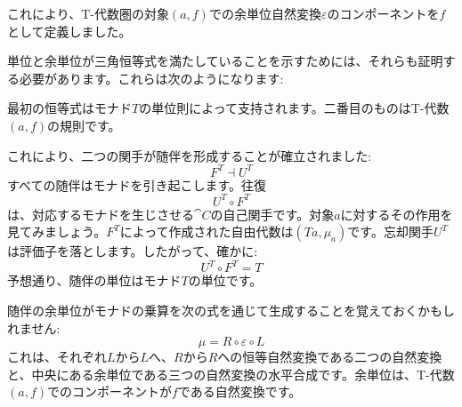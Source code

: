 \begin{figure}[H]
  \centering
\end{figure}

\noindent
これにより、T-代数圏の対象$(a, f)$での余単位自然変換$\varepsilon$のコンポーネントを$f$として定義しました。

単位と余単位が三角恒等式を満たしていることを示すためには、それらも証明する必要があります。これらは次のようになります: 

\begin{figure}[H]
  \centering
  \begin{subfigure}
    \centering
  \end{subfigure}%
  \hspace{1cm}
  \begin{subfigure}
    \centering
  \end{subfigure}
\end{figure}

\noindent
最初の恒等式はモナド$T$の単位則によって支持されます。二番目のものはT-代数$(a, f)$の規則です。

これにより、二つの関手が随伴を形成することが確立されました: 
\[F^T \dashv U^T\]
すべての随伴はモナドを引き起こします。往復
\[U^T \circ F^T\]
は、対応するモナドを生じさせる$\cat{C}$の自己関手です。対象$a$に対するその作用を見てみましょう。$F^T$によって作成された自由代数は$(T a, \mu_a)$です。忘却関手$U^T$は評価子を落とします。したがって、確かに: 
\[U^T \circ F^T = T\]
予想通り、随伴の単位はモナド$T$の単位です。

随伴の余単位がモナドの乗算を次の式を通じて生成することを覚えておくかもしれません: 
\[\mu = R \circ \varepsilon \circ L\]
これは、それぞれ$L$から$L$へ、$R$から$R$への恒等自然変換である二つの自然変換と、中央にある余単位である三つの自然変換の水平合成です。余単位は、T-代数$(a, f)$でのコンポーネントが$f$である自然変換です。

